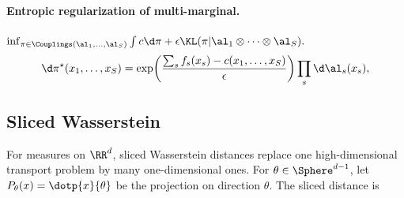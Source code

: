 \paragraph{Entropic regularization of multi-marginal.}
\(\inf_{\pi\in\Couplings(\al_1,\ldots,\al_S)} \int c\d\pi+\epsilon\KL(\pi|\al_1\otimes\cdots\otimes\al_S).\)
\[
\d\pi^\star(x_1,\ldots,x_S)
=
\exp\!\left(\frac{\sum_s f_s(x_s)-c(x_1,\ldots,x_S)}{\epsilon}\right)
\prod_s\d\al_s(x_s),
\]
\subsection{Sliced Wasserstein}
\label{sec-sliced-wasserstein}
For measures on $\RR^d$, sliced Wasserstein distances replace one high-dimensional transport problem by many one-dimensional ones. For $\theta \in \Sphere^{d-1}$, let $P_\theta(x)=\dotp{x}{\theta}$ be the projection on direction $\theta$. The sliced distance is

